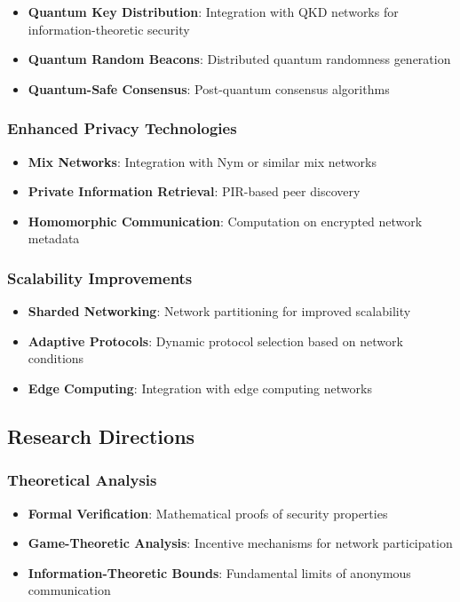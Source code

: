 \documentclass[11pt,a4paper]{article}
\theoremstyle{definition}
\theoremstyle{remark}
\begin{document}
\begin{itemize}
    \item \textbf{Quantum Key Distribution}: Integration with QKD networks for information-theoretic security
    \item \textbf{Quantum Random Beacons}: Distributed quantum randomness generation
    \item \textbf{Quantum-Safe Consensus}: Post-quantum consensus algorithms
\end{itemize}

\subsubsection{Enhanced Privacy Technologies}

\begin{itemize}
    \item \textbf{Mix Networks}: Integration with Nym or similar mix networks
    \item \textbf{Private Information Retrieval}: PIR-based peer discovery
    \item \textbf{Homomorphic Communication}: Computation on encrypted network metadata
\end{itemize}

\subsubsection{Scalability Improvements}

\begin{itemize}
    \item \textbf{Sharded Networking}: Network partitioning for improved scalability
    \item \textbf{Adaptive Protocols}: Dynamic protocol selection based on network conditions
    \item \textbf{Edge Computing}: Integration with edge computing networks
\end{itemize}

\subsection{Research Directions}

\subsubsection{Theoretical Analysis}

\begin{itemize}
    \item \textbf{Formal Verification}: Mathematical proofs of security properties
    \item \textbf{Game-Theoretic Analysis}: Incentive mechanisms for network participation
    \item \textbf{Information-Theoretic Bounds}: Fundamental limits of anonymous communication
\end{itemize}
\end{document}
